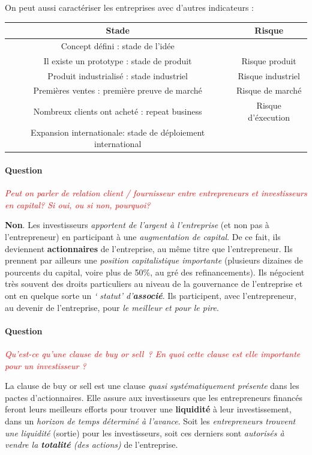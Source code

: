\documentclass[12pt,oneside,a4paper]{article}
\newcommand{\question}[1]
{
\addtocounter{section}{1}
\paragraph*{Question \thesection}
\emph{\textcolor{red}{#1}}
}
\begin{document}
On peut aussi caractériser les entreprises avec d'autres indicateurs : 

\vspace{1cm}
\begin{center}
\begin{tabular}{|c|c|}
	\hline
	Stade & Risque\\
	\hline
	Concept défini : stade de l'idée & \\
	\hline
	Il existe un prototype : stade de produit & Risque produit\\
	\hline
	Produit industrialisé : stade industriel & Risque industriel\\
	\hline
	Premières ventes : première preuve de marché & Risque de marché\\
	\hline
	Nombreux clients ont acheté : repeat business & Risque d'éxecution\\
	\hline
	Expansion internationale: stade de déploiement international & \\
	\hline

\end{tabular}
\end{center}
\vspace{1cm}

\question{Peut on parler de relation client / fournisseur entre entrepreneurs et investisseurs en capital? Si oui, ou si non, pourquoi?}

\textbf{Non}. Les investisseurs \emph{apportent de l’argent à l’entreprise} (et non pas à l’entrepreneur) en participant à une \emph{augmentation de capital}. De ce fait, ils deviennent \textbf{actionnaires} de l’entreprise, au même titre que l’entrepreneur. Ils prennent par ailleurs une \emph{position capitalistique importante} (plusieurs dizaines de pourcents du capital, voire plus de 50$ \%$, au gré des refinancements). Ils négocient très souvent des droits particuliers au niveau de la gouvernance de l’entreprise et ont en quelque sorte un\emph{ `	statut' d’\textbf{associé}}. Ils participent, avec l’entrepreneur, au devenir de l’entreprise, pour \emph{le meilleur et pour le pire}.

\question{Qu’est-ce qu’une clause de buy or sell ? En quoi cette clause est elle importante pour un investisseur ?}

La clause de buy or sell est une clause \emph{quasi systématiquement présente} dans les pactes d’actionnaires. Elle assure aux investisseurs que les entrepreneurs financés feront leurs meilleurs efforts pour trouver une \textbf{liquidité} à leur investissement, dans un \emph{horizon de temps déterminé à l’avance}. Soit les \emph{entrepreneurs trouvent une liquidité} (sortie) pour les investisseurs, soit ces derniers sont \emph{autorisés à vendre la \textbf{totalité} (des actions)} de l’entreprise.
\end{document}
